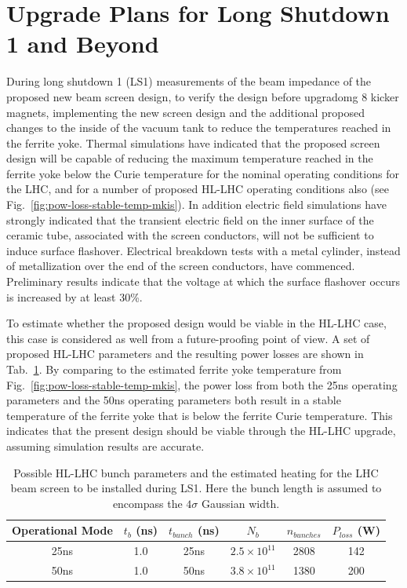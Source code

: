 \section{Upgrade Plans for Long Shutdown 1 and Beyond}

During long shutdown 1 (LS1) measurements of the beam impedance of the proposed new beam screen design, to verify the design before upgradomg 8 kicker magnets, implementing the new screen design and the additional proposed changes to the inside of the vacuum tank to reduce the temperatures reached in the ferrite yoke. Thermal simulations have indicated that the proposed screen design will be capable of reducing the maximum temperature reached in the ferrite yoke below the Curie temperature for the nominal operating conditions for the LHC, and for a number of proposed HL-LHC operating conditions also (see Fig.~\ref{fig:pow-loss-stable-temp-mkis}). In addition electric field simulations have strongly indicated that the transient electric field on the inner surface of the ceramic tube, associated with the screen conductors, will not be sufficient to induce surface flashover. Electrical breakdown tests with a metal cylinder, instead of metallization over the end of the screen conductors, have commenced. Preliminary results indicate that the voltage at which the surface flashover occurs is increased by at least 30\%.

To estimate whether the proposed design would be viable in the HL-LHC case, this case is considered as well from a future-proofing point of view. A set of proposed HL-LHC parameters and the resulting power losses are shown in Tab.~\ref{tab:BrenHLPara}. By comparing to the estimated ferrite yoke temperature from Fig.~\ref{fig:pow-loss-stable-temp-mkis}, the power loss from both the 25ns operating parameters and the 50ns operating parameters both result in a stable temperature of the ferrite yoke that is below the ferrite Curie temperature. This indicates that the present design should be viable through the HL-LHC upgrade, assuming simulation results are accurate.

\begin{table}
\caption{Possible HL-LHC bunch parameters and the estimated heating for the LHC beam screen to be installed during LS1. Here the bunch length is assumed to encompass the $4\sigma$ Gaussian width.}
\label{tab:BrenHLPara}
\begin{center}
\begin{tabular}{c | c | c | c | c | c}
Operational Mode & $t_{b}$ (ns) & $t_{bunch}$ (ns) & $N_{b}$ & $n_{bunches}$ & $P_{loss}$ (W)\\ \hline
25ns & 1.0 & 25ns & $2.5 \times 10^{11}$ & 2808 & 142\\ \hline
50ns & 1.0 & 50ns & $3.8 \times 10^{11}$ & 1380 & 200\\ 
\end{tabular}
\end{center}
\end{table}

